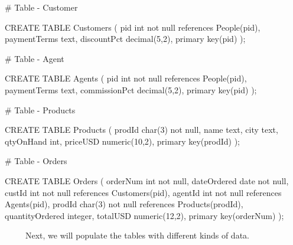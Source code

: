 \documentclass[
  letterpaper,
  DIV=11,
  numbers=noendperiod]{scrreprt}
\newenvironment{Shaded}{\begin{snugshade}}{\end{snugshade}}
\newcommand{\CommentTok}[1]{\textcolor[rgb]{0.37,0.37,0.37}{#1}}
\newcommand{\DecValTok}[1]{\textcolor[rgb]{0.68,0.00,0.00}{#1}}
\newcommand{\FunctionTok}[1]{\textcolor[rgb]{0.28,0.35,0.67}{#1}}
\newcommand{\NormalTok}[1]{\textcolor[rgb]{0.00,0.23,0.31}{#1}}
\begin{document}
\begin{Shaded}
\begin{Highlighting}[]
\CommentTok{\# Table {-} Customer }

\NormalTok{CREATE TABLE }\FunctionTok{Customers}\NormalTok{ (}
\NormalTok{ pid int not null references }\FunctionTok{People}\NormalTok{(pid),}
\NormalTok{ paymentTerms text,}
\NormalTok{ discountPct }\FunctionTok{decimal}\NormalTok{(}\DecValTok{5}\NormalTok{,}\DecValTok{2}\NormalTok{),}
\NormalTok{ primary }\FunctionTok{key}\NormalTok{(pid)}
\NormalTok{);}

\CommentTok{\# Table {-} Agent }

\NormalTok{CREATE TABLE }\FunctionTok{Agents}\NormalTok{ (}
\NormalTok{ pid int not null references }\FunctionTok{People}\NormalTok{(pid),}
\NormalTok{ paymentTerms text,}
\NormalTok{ commissionPct }\FunctionTok{decimal}\NormalTok{(}\DecValTok{5}\NormalTok{,}\DecValTok{2}\NormalTok{),}
\NormalTok{ primary }\FunctionTok{key}\NormalTok{(pid)}
\NormalTok{);}

\CommentTok{\# Table {-} Products }

\NormalTok{CREATE TABLE }\FunctionTok{Products}\NormalTok{ (}
\NormalTok{ prodId }\FunctionTok{char}\NormalTok{(}\DecValTok{3}\NormalTok{) not null,}
\NormalTok{ name text,}
\NormalTok{ city text,}
\NormalTok{ qtyOnHand int,}
\NormalTok{ priceUSD }\FunctionTok{numeric}\NormalTok{(}\DecValTok{10}\NormalTok{,}\DecValTok{2}\NormalTok{),}
\NormalTok{ primary }\FunctionTok{key}\NormalTok{(prodId)}
\NormalTok{);}

\CommentTok{\# Table {-} Orders }

\NormalTok{CREATE TABLE }\FunctionTok{Orders}\NormalTok{ (}
\NormalTok{ orderNum int not null,}
\NormalTok{ dateOrdered date not null,}
\NormalTok{ custId int not null references }\FunctionTok{Customers}\NormalTok{(pid),}
\NormalTok{ agentId int not null references }\FunctionTok{Agents}\NormalTok{(pid),}
\NormalTok{ prodId }\FunctionTok{char}\NormalTok{(}\DecValTok{3}\NormalTok{) not null references }\FunctionTok{Products}\NormalTok{(prodId),}
\NormalTok{  quantityOrdered integer,}
\NormalTok{ totalUSD }\FunctionTok{numeric}\NormalTok{(}\DecValTok{12}\NormalTok{,}\DecValTok{2}\NormalTok{),}
\NormalTok{ primary }\FunctionTok{key}\NormalTok{(orderNum)}
\NormalTok{);}
\end{Highlighting}
\end{Shaded}

~~~~~Next, we will populate the tables with different kinds of data.
\end{document}
